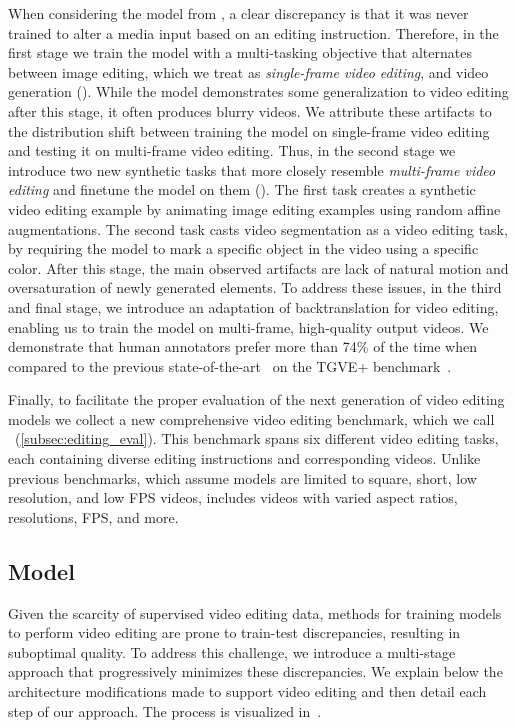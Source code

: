When considering the \textToV model from , a clear discrepancy is that it was never trained to alter a media input based on an editing instruction.
Therefore, in the first stage we train the \textToV model with a multi-tasking objective that alternates between image editing, which we treat as \textit{single-frame video editing}, and video generation ().
While the model demonstrates some generalization to video editing after this stage, it often produces blurry videos.
We attribute these artifacts to the distribution shift between training the model on single-frame video editing and testing it on multi-frame video editing.
Thus, in the second stage we introduce two new synthetic tasks that more closely resemble \textit{multi-frame video editing} and finetune the model on them ().
The first task creates a synthetic video editing example by animating image editing examples using random affine augmentations.
The second task casts video segmentation as a video editing task, by requiring the model to mark a specific object in the video using a specific color.
After this stage, the main observed artifacts are lack of natural motion and oversaturation of newly generated elements.
To address these issues, in the third and final stage, we introduce an adaptation of backtranslation for video editing, enabling us to train the model on multi-frame, high-quality output videos.
We demonstrate that human annotators prefer \OursVideoEdit more than 74\% of the time when compared to the previous state-of-the-art~\citep{EVE} on the TGVE+ benchmark~\citep{wu2023cvpr,EVE}.

Finally, to facilitate the proper evaluation of the next generation of video editing models we collect a new comprehensive video editing benchmark, which we call \OursVideoEditBench~(\cref{subsec:editing_eval}).
This benchmark spans six different video editing tasks, each containing diverse editing instructions and corresponding videos.
Unlike previous benchmarks, which assume models are limited to square, short, low resolution, and low FPS videos, \OursVideoEditBench includes videos with varied aspect ratios, resolutions, FPS, and more.

\subsection{Model}\label{sec:edit_method}
Given the scarcity of supervised video editing data, methods for training models to perform video editing are prone to train-test discrepancies, resulting in suboptimal quality.
To address this challenge, we introduce a multi-stage approach that progressively minimizes these discrepancies.
We explain below the architecture modifications made to support video editing and then detail each step of our approach.
The process is visualized in~.

